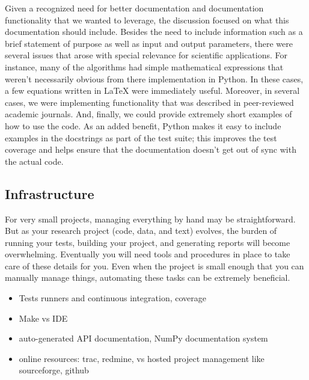 \documentclass[ChapterTOCs,krantz2]{krantz} %
\theoremstyle{definition}
\begin{document}
Given a recognized need for better documentation and documentation
functionality that we wanted to leverage, the discussion focused on what this
documentation should include. Besides the need to include information such as a
brief statement of purpose as well as input and output parameters, there were
several issues that arose with special relevance for scientific applications.
For instance, many of the algorithms had simple mathematical expressions that
weren't necessarily obvious from there implementation in Python. In these
cases, a few equations written in \LaTeX{} were immediately useful. Moreover,
in several cases, we were implementing functionality that was described in
peer-reviewed academic journals. And, finally, we could provide extremely
short examples of how to use the code. As an added benefit, Python makes it
easy to include examples in the docstrings as part of the test suite; this
improves the test coverage and helps ensure that the documentation doesn't get
out of sync with the actual code.

\subsection{Infrastructure}

For very small projects, managing everything by hand may be straightforward.
But as your research project (code, data, and text) evolves, the burden of
running your tests, building your project, and generating reports will become
overwhelming. Eventually you will need tools and procedures in place to take
care of these details for you. Even when the project is small enough that you
can manually manage things, automating these tasks can be extremely beneficial.
\cite{doar2005practical}

\begin{itemize}

\item Tests runners and continuous integration, coverage

\item Make vs IDE

\item auto-generated API documentation, NumPy documentation system \cite{SciPyProceedings_27}

\item online resources: trac, redmine, vs hosted project management like
      sourceforge, github

\end{itemize}
\end{document}
